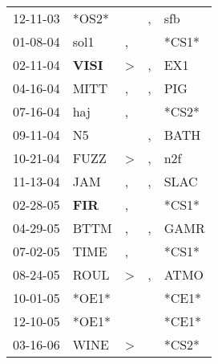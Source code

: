 \begin{supertabular}{p{0.07\textwidth}p{0.06\textwidth}p{0.02\textwidth}p{0.02\textwidth}p{0.06\textwidth}}
 12-11-03\textsuperscript{} &                            *OS2* &                  &             , &            sfb\textsuperscript{} \\
 01-08-04\textsuperscript{} &           sol1\textsuperscript{} &                , &               &                            *CS1* \\
 02-11-04\textsuperscript{} &  \textbf{VISI\textsuperscript{}} &     \textgreater &             , &            EX1\textsuperscript{} \\
 04-16-04\textsuperscript{} &           MITT\textsuperscript{} &                , &             , &            PIG\textsuperscript{} \\
 07-16-04\textsuperscript{} &            haj\textsuperscript{} &                , &               &                            *CS2* \\
 09-11-04\textsuperscript{} &             N5\textsuperscript{} &                  &             , &           BATH\textsuperscript{} \\
 10-21-04\textsuperscript{} &           FUZZ\textsuperscript{} &     \textgreater &             , &            n2f\textsuperscript{} \\
 11-13-04\textsuperscript{} &            JAM\textsuperscript{} &                , &             , &           SLAC\textsuperscript{} \\
 02-28-05\textsuperscript{} &   \textbf{FIR\textsuperscript{}} &                , &               &                            *CS1* \\
 04-29-05\textsuperscript{} &           BTTM\textsuperscript{} &                , &             , &           GAMR\textsuperscript{} \\
 07-02-05\textsuperscript{} &           TIME\textsuperscript{} &                , &               &                            *CS1* \\
 08-24-05\textsuperscript{} &           ROUL\textsuperscript{} &     \textgreater &             , &           ATMO\textsuperscript{} \\
 10-01-05\textsuperscript{} &                            *OE1* &                  &               &                            *CE1* \\
 12-10-05\textsuperscript{} &                            *OE1* &                  &               &                            *CE1* \\
 03-16-06\textsuperscript{} &           WINE\textsuperscript{} &     \textgreater &               &                            *CS2* \\

\end{supertabular}
